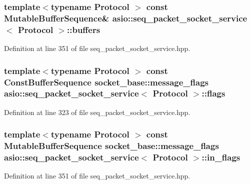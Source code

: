 \subsubsection[{buffers}]{\setlength{\rightskip}{0pt plus 5cm}template$<$typename Protocol $>$ const Mutable\+Buffer\+Sequence\& {\bf asio\+::seq\+\_\+packet\+\_\+socket\+\_\+service}$<$ Protocol $>$\+::buffers}\label{classasio_1_1seq__packet__socket__service_a820f896bd3a6c0373bbae920831ba146}


Definition at line 351 of file seq\+\_\+packet\+\_\+socket\+\_\+service.\+hpp.

\hypertarget{classasio_1_1seq__packet__socket__service_a51223946b3c10b64f0d7fc0f1ca0227c}{}
\subsubsection[{flags}]{\setlength{\rightskip}{0pt plus 5cm}template$<$typename Protocol $>$ const Const\+Buffer\+Sequence {\bf socket\+\_\+base\+::message\+\_\+flags} {\bf asio\+::seq\+\_\+packet\+\_\+socket\+\_\+service}$<$ Protocol $>$\+::flags}\label{classasio_1_1seq__packet__socket__service_a51223946b3c10b64f0d7fc0f1ca0227c}


Definition at line 323 of file seq\+\_\+packet\+\_\+socket\+\_\+service.\+hpp.

\hypertarget{classasio_1_1seq__packet__socket__service_af6a9566db676cb05aa05680d4d215245}{}
\subsubsection[{in\+\_\+flags}]{\setlength{\rightskip}{0pt plus 5cm}template$<$typename Protocol $>$ const Mutable\+Buffer\+Sequence {\bf socket\+\_\+base\+::message\+\_\+flags} {\bf asio\+::seq\+\_\+packet\+\_\+socket\+\_\+service}$<$ Protocol $>$\+::in\+\_\+flags}\label{classasio_1_1seq__packet__socket__service_af6a9566db676cb05aa05680d4d215245}


Definition at line 351 of file seq\+\_\+packet\+\_\+socket\+\_\+service.\+hpp.

